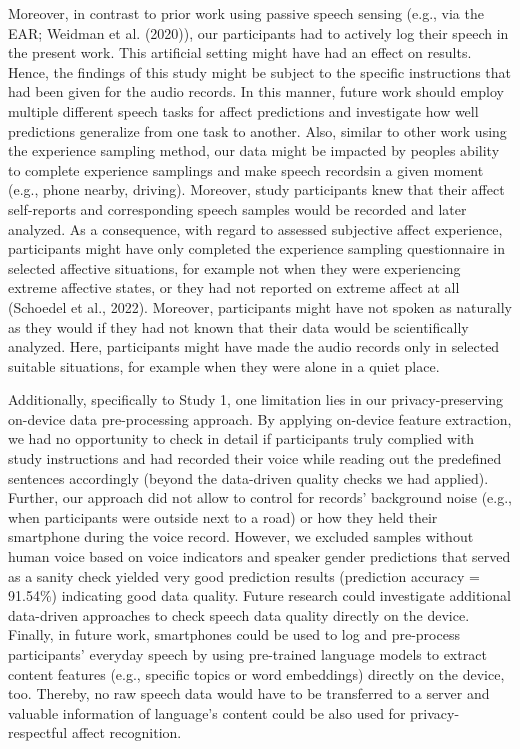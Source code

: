 \documentclass[
  english,
  man,floatsintext]{apa6}
\begin{document}
Moreover, in contrast to prior work using passive speech sensing (e.g., via the EAR; Weidman et al. (2020)), our participants had to actively log their speech in the present work. This artificial setting might have had an effect on results. Hence, the findings of this study might be subject to the specific instructions that had been given for the audio records. In this manner, future work should employ multiple different speech tasks for affect predictions and investigate how well predictions generalize from one task to another.
Also, similar to other work using the experience sampling method, our data might be impacted by peoples ability to complete experience samplings and make speech recordsin a given moment (e.g., phone nearby, driving). Moreover, study participants knew that their affect self-reports and corresponding speech samples would be recorded and later analyzed. As a consequence, with regard to assessed subjective affect experience, participants might have only completed the experience sampling questionnaire in selected affective situations, for example not when they were experiencing extreme affective states, or they had not reported on extreme affect at all (Schoedel et al., 2022). Moreover, participants might have not spoken as naturally as they would if they had not known that their data would be scientifically analyzed. Here, participants might have made the audio records only in selected suitable situations, for example when they were alone in a quiet place.

Additionally, specifically to Study 1, one limitation lies in our privacy-preserving on-device data pre-processing approach. By applying on-device feature extraction, we had no opportunity to check in detail if participants truly complied with study instructions and had recorded their voice while reading out the predefined sentences accordingly (beyond the data-driven quality checks we had applied). Further, our approach did not allow to control for records' background noise (e.g., when participants were outside next to a road) or how they held their smartphone during the voice record. However, we excluded samples without human voice based on voice indicators and speaker gender predictions that served as a sanity check yielded very good prediction results (prediction accuracy = 91.54\%) indicating good data quality. Future research could investigate additional data-driven approaches to check speech data quality directly on the device. Finally, in future work, smartphones could be used to log and pre-process participants' everyday speech by using pre-trained language models to extract content features (e.g., specific topics or word embeddings) directly on the device, too. Thereby, no raw speech data would have to be transferred to a server and valuable information of language's content could be also used for privacy-respectful affect recognition.
\end{document}
